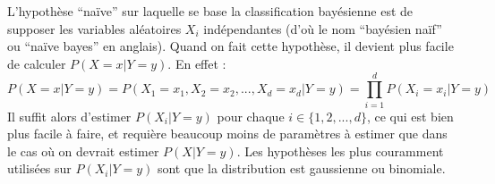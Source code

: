 L'hypothèse ``naïve'' sur laquelle se base la classification bayésienne est de supposer
les variables aléatoires $X_i$ indépendantes (d'où le nom ``bayésien naïf'' ou ``naïve bayes''
en anglais). Quand on fait cette hypothèse, il devient plus facile de calculer $P(X=x|Y=y)$.
En effet :
\[
    P(X=x|Y=y) = P(X_1=x_1, X_2=x_2, ..., X_d=x_d|Y=y) = \prod_{i=1}^d P(X_i=x_i|Y=y)
\]
Il suffit alors d'estimer $P(X_i|Y=y)$ pour chaque $i \in \{1, 2, ..., d\}$, ce qui est bien
plus facile à faire, et requière beaucoup moins de paramètres à estimer que dans le cas où
on devrait estimer $P(X|Y=y)$. Les hypothèses les plus couramment utilisées sur $P(X_i|Y=y)$
sont que la distribution est gaussienne ou binomiale.